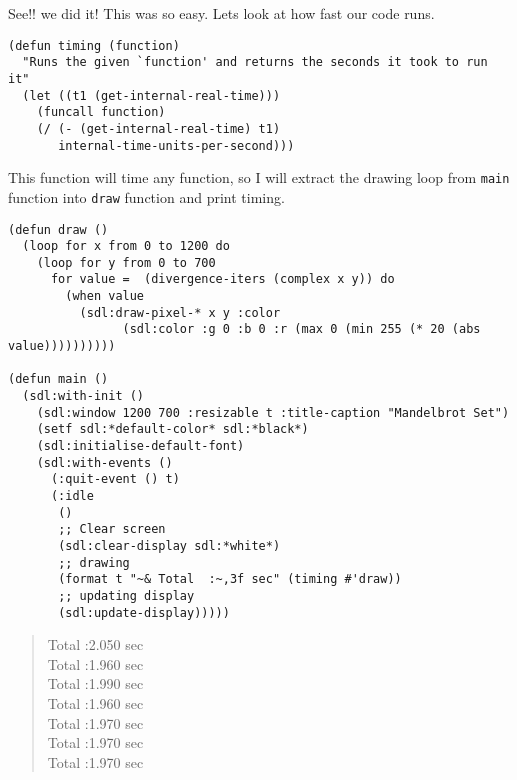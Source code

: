 \documentclass[11pt,a4paper]{article}
\begin{document}
See!! we did it! This was so easy.
Lets look at how fast our code runs.

\begin{lstlisting}
(defun timing (function)
  "Runs the given `function' and returns the seconds it took to run it"
  (let ((t1 (get-internal-real-time)))
    (funcall function)
    (/ (- (get-internal-real-time) t1)
       internal-time-units-per-second)))
\end{lstlisting}
This function will time any function, so I will extract the drawing loop from \texttt{main} function into \texttt{draw} function and print timing. 

\begin{lstlisting}
(defun draw ()
  (loop for x from 0 to 1200 do
    (loop for y from 0 to 700
	  for value =  (divergence-iters (complex x y)) do
	    (when value 
	      (sdl:draw-pixel-* x y :color
				(sdl:color :g 0 :b 0 :r (max 0 (min 255 (* 20 (abs value))))))))))

(defun main ()
  (sdl:with-init ()
    (sdl:window 1200 700 :resizable t :title-caption "Mandelbrot Set")
    (setf sdl:*default-color* sdl:*black*)
    (sdl:initialise-default-font)
    (sdl:with-events ()
      (:quit-event () t)
      (:idle
       ()
       ;; Clear screen
       (sdl:clear-display sdl:*white*)
       ;; drawing
       (format t "~& Total  :~,3f sec" (timing #'draw))
       ;; updating display
       (sdl:update-display)))))
\end{lstlisting}

\begin{verse}
Total  :2.050 sec\\
Total  :1.960 sec\\
Total  :1.990 sec\\
Total  :1.960 sec\\
Total  :1.970 sec\\
Total  :1.970 sec\\
Total  :1.970 sec\\
\end{verse}
\end{document}
